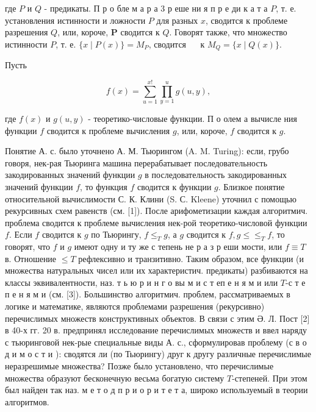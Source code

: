 \documentclass[10pt]{article}
\begin{document}
где $P$ и $Q$ - предикаты. П р о бле м а р а 3 р еше ни я п р е ди к а т а $P$, т. е. установления истинности и ложности $P$ для разных $x$, сводится к проблеме разрешения $Q$, или, короче, $\boldsymbol{P}$ сводится к $Q$. Говорят также, что множество истинности $P$, т. е. $\{x \mid P(x)\}=M_{P}$, сводится $\quad$ к $M_{Q}=\{x \mid Q(x)\}$.



Пусть



\[

f(x)=\sum_{u=1}^{x !} \prod_{y=1}^{u} g(u, y),

\]



где $f(x)$ и $g(u, y)$ - теоретико-числовые функции. П о олем а вычисле ния функции $f$ сводится к проблеме вычисления $g$, или, короче, $f$ сводится к $g$.



Понятие А. с. было уточнено А. М. Тьюрингом (A. M. Turing): если, грубо говоря, нек-рая Тьюринга машина перерабатывает последовательность закодированных значений функции $g$ в последовательность закодированных значений функции $f$, то функция $f$ сводится к функции $g$. Близкое понятие относительной вычислимости С. К. Клини (S. С. Kleene) уточнил с помощью рекурсивных схем равенств (см. [1]). После арифометизации каждая алгоритмич. проблема сводится к проблеме вычисления нек-рой теоретико-числовой функции $f$. Если $f$ сводится к $g$ по Тьюрингу, $f \leqslant_{T} g$, а $g$ сводится к $f, g \leqslant \leqslant_{T} f$, то говорят, что $f$ и $g$ имеют одну и ту же с тепень не р а з р еши мости, или $f \equiv T$ в. Отношение $\leqslant T$ рефлексивно и транзитивно. Таким образом, все функции (и множества натуральных чисел или их характеристич. предикаты) разбиваются на классы эквивалентности, наз. т ь ю р и н г о вы м и с т еп е н я м и или $T$-с т е п е н я м и (см. [3]). Большинство алгоритмич. проблем, рассматриваемых в логике и математике, являются проблемами разрешения (рекурсивно) перечислимых множеств конструктивных объектов. В связи с этим Ә. Л. Пост [2] в 40-х гг. 20 в. предпринял исследование перечислимых множеств и ввел наряду с тьюринговой нек-рые специальные виды А. с., сформулировав проблему (с в о д и м о с т и ): сводятся ли (по Тьюрингу) друг к другу различные перечислимые неразрешимые множества? Позже было установлено, что перечислимые множества образуют бесконечную весьма богатую систему $T$-степеней. При этом был найден так наз. м е т о д п р и о р и т е т а, широко используемый в теории алгоритмов.
\end{document}
